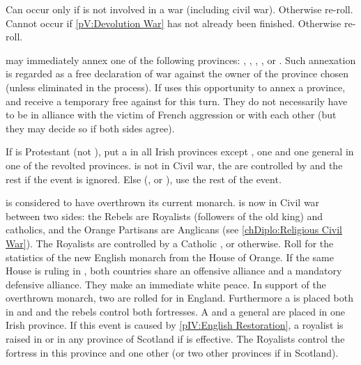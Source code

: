 
\condition{}
\aparag Can occur only if \FRA is not involved in a war (including civil
war). Otherwise re-roll.
\aparag Cannot occur if \ref{pV:Devolution War} has not already been
finished. Otherwise re-roll.

\phevnt
\aparag \FRA may immediately annex one of the following provinces:
\provincePicardie, \provinceRosselo, ,
\provinceLuxemburg, \provinceAlsace or \provinceLorraine.  Such annexation is
regarded as a free declaration of war against the owner of the province chosen
(unless eliminated in the process).
\aparag If \FRA uses this opportunity to annex a province, \HOL and \ENG
receive a temporary free \CB against \FRA for this turn. They do not
necessarily have to be in alliance with the victim of French aggression or
with each other (but they may decide so if both sides agree).





\condition{}
\aparag If \ENG is Protestant (not \PROTANG), put a \REVOLT \facemoins in all
Irish provinces except \provinceUladh, one \LD and one general in one of the
revolted provinces. \ENG is not in Civil war, the \REVOLT are controlled by
\HOL and the rest if the event is ignored.
\aparag Else (\CATHCR, \CATHCO or \PROTANG), use the rest of the event.

\phevnt
\aparag \ENG is considered to have overthrown its current monarch.  \ENG is
now in Civil war between two sides: the Rebels are Royalists (followers of the
old king) and catholics, and the Orange Partisans are Anglicans (see
\ref{chDiplo:Religious Civil War}).
\bparag The Royalists are controlled by a Catholic \FRA, or \SPA otherwise.
\bparag Roll for the statistics of the new English monarch from the House of
Orange. If the same House is ruling in \HOL, both countries share an offensive
alliance and a mandatory defensive alliance. They make an immediate white
peace.
\aparag In support of the overthrown monarch, two \REVOLT are rolled for in
England. Furthermore a \REVOLT \faceplus is placed both in \provinceConnacht
and \provinceMumhan and the rebels control both fortresses. A \LD and a
general are placed in one Irish province.
\bparag If this event is caused by \ref{pIV:English Restoration}, a royalist
\ARMY \facemoins is raised in \provinceCymru or in any province of Scotland if
 is effective. The Royalists control the fortress
in this province and one other (or two other provinces if in Scotland).

